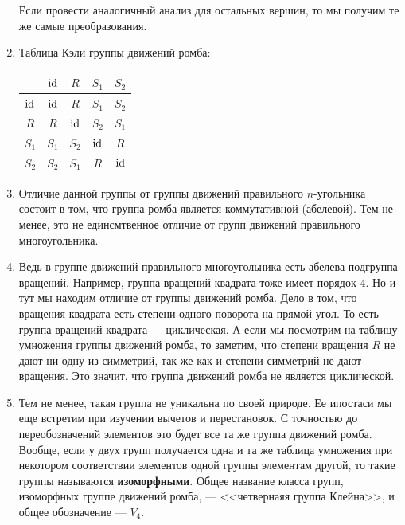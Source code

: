 \begin{enumerate}
Если провести аналогичный анализ для остальных вершин, то мы получим те же самые преобразования.
\item Таблица Кэли группы движений ромба:
\begin{center}
\begin{tabular}{c||c|c|c|c|}
      & $\mathrm{id}$     & $R$   & $S_1$ & $S_2$ \\ \hline\hline
$\mathrm{id}$ & $\mathrm{id}$     & $R$   & $S_1$ & $S_2$ \\ \hline
$R$   & $R$       & $\mathrm{id}$ & $S_2$ & $S_1$ \\ \hline
$S_1$ & $S_1$     & $S_2$ & $\mathrm{id}$ & $R$ \\ \hline
$S_2$ & $S_2$     & $S_1$ & $R$   & $\mathrm{id}$ \\ \hline
\end{tabular}
\end{center}
\item Отличие данной группы от группы движений правильного $n$-угольника состоит в том, что группа ромба является коммутативной (абелевой). Тем не менее, это не единсмтвенное отличие от групп движений правильного многоугольника.
\item Ведь в группе движений правильного многоугольника есть абелева подгруппа вращений. Например, группа вращений квадрата тоже имеет порядок 4. Но и тут мы находим отличие от группы движений ромба. Дело в том, что вращения квадрата есть степени одного поворота на прямой угол. То есть группа вращений квадрата --- циклическая. А если мы посмотрим на таблицу умножения группы движений ромба, то заметим, что степени вращения $R$ не дают ни одну из симметрий, так же как и степени симметрий не дают вращения. Это значит, что группа движений ромба не является циклической.
\item Тем не менее, такая группа не уникальна по своей природе. Ее ипостаси мы еще встретим при изучении вычетов и перестановок. С точностью до переобозначений элементов это будет все та же группа движений ромба. Вообще, если у двух групп получается одна и та же таблица умножения при некотором соответствии элементов одной группы элементам другой, то такие группы называются \textbf{изоморфными}. Общее название класса групп, изоморфных группе движений ромба, --- <<четвернаяя группа Клейна>>, и общее обозначение --- $V_4$.
\end{enumerate}



